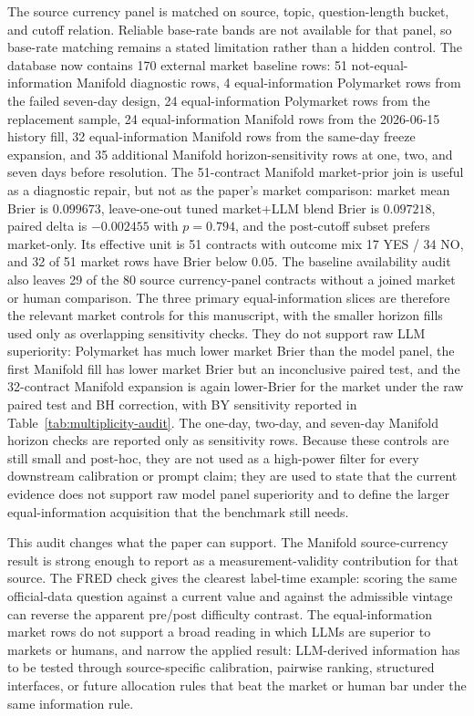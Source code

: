 \documentclass[11pt]{article}
\begin{document}
The source currency panel is matched on source, topic, question-length bucket, and cutoff relation. Reliable base-rate bands are not available for that panel, so base-rate matching remains a stated limitation rather than a hidden control. The database now contains 170 external market baseline rows: 51 not-equal-information Manifold diagnostic rows, 4 equal-information Polymarket rows from the failed seven-day design, 24 equal-information Polymarket rows from the replacement sample, 24 equal-information Manifold rows from the 2026-06-15 history fill, 32 equal-information Manifold rows from the same-day freeze expansion, and 35 additional Manifold horizon-sensitivity rows at one, two, and seven days before resolution. The 51-contract Manifold market-prior join is useful as a diagnostic repair, but not as the paper's market comparison: market mean Brier is \(0.099673\), leave-one-out tuned market+LLM blend Brier is \(0.097218\), paired delta is \(-0.002455\) with \(p=0.794\), and the post-cutoff subset prefers market-only. Its effective unit is 51 contracts with outcome mix 17 YES / 34 NO, and 32 of 51 market rows have Brier below \(0.05\). The baseline availability audit also leaves 29 of the 80 source currency-panel contracts without a joined market or human comparison. The three primary equal-information slices are therefore the relevant market controls for this manuscript, with the smaller horizon fills used only as overlapping sensitivity checks. They do not support raw LLM superiority: Polymarket has much lower market Brier than the model panel, the first Manifold fill has lower market Brier but an inconclusive paired test, and the 32-contract Manifold expansion is again lower-Brier for the market under the raw paired test and BH correction, with BY sensitivity reported in Table~\ref{tab:multiplicity-audit}. The one-day, two-day, and seven-day Manifold horizon checks are reported only as sensitivity rows. Because these controls are still small and post-hoc, they are not used as a high-power filter for every downstream calibration or prompt claim; they are used to state that the current evidence does not support raw model panel superiority and to define the larger equal-information acquisition that the benchmark still needs.

This audit changes what the paper can support. The Manifold source-currency result is strong enough to report as a measurement-validity contribution for that source. The FRED check gives the clearest label-time example: scoring the same official-data question against a current value and against the admissible vintage can reverse the apparent pre/post difficulty contrast. The equal-information market rows do not support a broad reading in which LLMs are superior to markets or humans, and narrow the applied result: LLM-derived information has to be tested through source-specific calibration, pairwise ranking, structured interfaces, or future allocation rules that beat the market or human bar under the same information rule.
\end{document}
